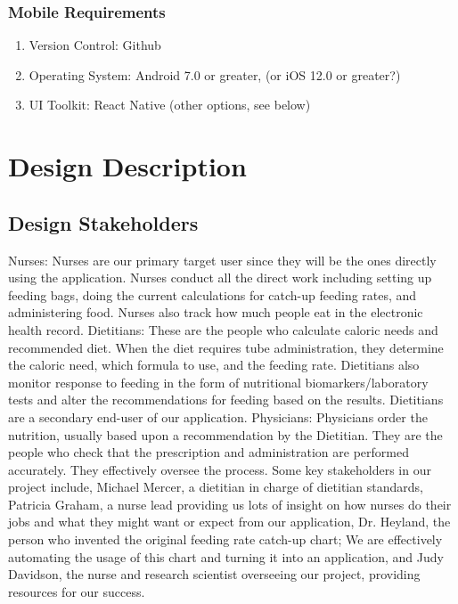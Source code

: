 \documentclass[onecolumn, draftclsnofoot,10pt, compsoc]{IEEEtran}
\begin{document}
\subsubsection{Mobile Requirements}
\begin{enumerate}
    \item Version Control: Github
    \item Operating System: Android 7.0 or greater, (or iOS 12.0 or greater?)
    \item UI Toolkit: React Native (other options, see below)
\end{enumerate}

\section{Design Description}
\subsection{Design Stakeholders}
Nurses: Nurses are our primary target user since they will be the ones directly using the application. Nurses conduct all the direct work including setting up feeding bags, doing the current calculations for catch-up feeding rates, and administering food. Nurses also track how much people eat in the electronic health record.  
\newline
Dietitians: These are the people who calculate caloric needs and recommended diet. When the diet requires tube administration, they determine the caloric need, which formula to use, and the feeding rate. Dietitians also monitor response to feeding in the form of nutritional biomarkers/laboratory tests and alter the recommendations for feeding based on the results. Dietitians are a secondary end-user of our application.
\newline
Physicians: Physicians order the nutrition, usually based upon a recommendation by the Dietitian. They are the people who check that the prescription and administration are performed accurately. They effectively oversee the process.
\newline
\newline
Some key stakeholders in our project include, Michael Mercer, a dietitian in charge of dietitian standards, Patricia Graham, a nurse lead providing us lots of insight on how nurses do their jobs and what they might want or expect from our application, Dr. Heyland, the person who invented the original feeding rate catch-up chart; We are effectively automating the usage of this chart and turning it into an application, and Judy Davidson, the nurse and research scientist overseeing our project, providing resources for our success.
\end{document}
